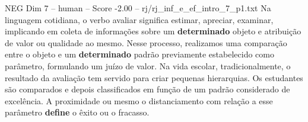 \begin{textsample}{NEG Dim 7 – human – Score -2.00 – rj/rj\_inf\_e\_ef\_intro\_7\_p1.txt}  \label{ex:f7_neg_006}
Na linguagem cotidiana, o verbo avaliar significa estimar, apreciar, examinar, implicando em coleta de informações sobre um \textbf{determinado} objeto e atribuição de valor ou qualidade ao mesmo.
Nesse processo, realizamos uma comparação entre o objeto e um \textbf{determinado} padrão previamente estabelecido como parâmetro, formulando um juízo de valor.
Na vida escolar, tradicionalmente, o resultado da avaliação tem servido para criar pequenas hierarquias.
Os estudantes são comparados e depois classificados em função de um padrão considerado de excelência.
A proximidade ou mesmo o distanciamento com relação a esse parâmetro \textbf{define} o êxito ou o fracasso.

\end{textsample}
